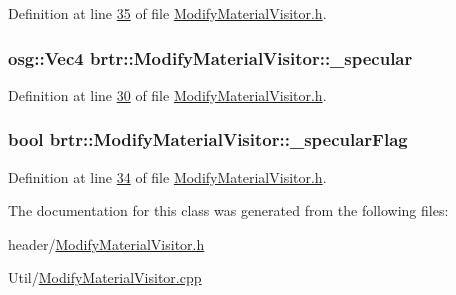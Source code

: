 Definition at line \hyperlink{_modify_material_visitor_8h_source_l00035}{35} of file \hyperlink{_modify_material_visitor_8h_source}{Modify\+Material\+Visitor.\+h}.

\hypertarget{classbrtr_1_1_modify_material_visitor_a4cbbdf6ecd85ec563839545fc328fbfe}{
\subsubsection[{\+\_\+specular}]{\setlength{\rightskip}{0pt plus 5cm}osg\+::\+Vec4 brtr\+::\+Modify\+Material\+Visitor\+::\+\_\+specular\hspace{0.3cm}{\ttfamily [private]}}}\label{classbrtr_1_1_modify_material_visitor_a4cbbdf6ecd85ec563839545fc328fbfe}


Definition at line \hyperlink{_modify_material_visitor_8h_source_l00030}{30} of file \hyperlink{_modify_material_visitor_8h_source}{Modify\+Material\+Visitor.\+h}.

\hypertarget{classbrtr_1_1_modify_material_visitor_a154ad99cb3796be6d04347cdbfb66e10}{
\subsubsection[{\+\_\+specular\+Flag}]{\setlength{\rightskip}{0pt plus 5cm}bool brtr\+::\+Modify\+Material\+Visitor\+::\+\_\+specular\+Flag\hspace{0.3cm}{\ttfamily [private]}}}\label{classbrtr_1_1_modify_material_visitor_a154ad99cb3796be6d04347cdbfb66e10}


Definition at line \hyperlink{_modify_material_visitor_8h_source_l00034}{34} of file \hyperlink{_modify_material_visitor_8h_source}{Modify\+Material\+Visitor.\+h}.



The documentation for this class was generated from the following files\+:\begin{DoxyCompactItemize}
\item 
header/\hyperlink{_modify_material_visitor_8h}{Modify\+Material\+Visitor.\+h}\item 
Util/\hyperlink{_modify_material_visitor_8cpp}{Modify\+Material\+Visitor.\+cpp}\end{DoxyCompactItemize}
